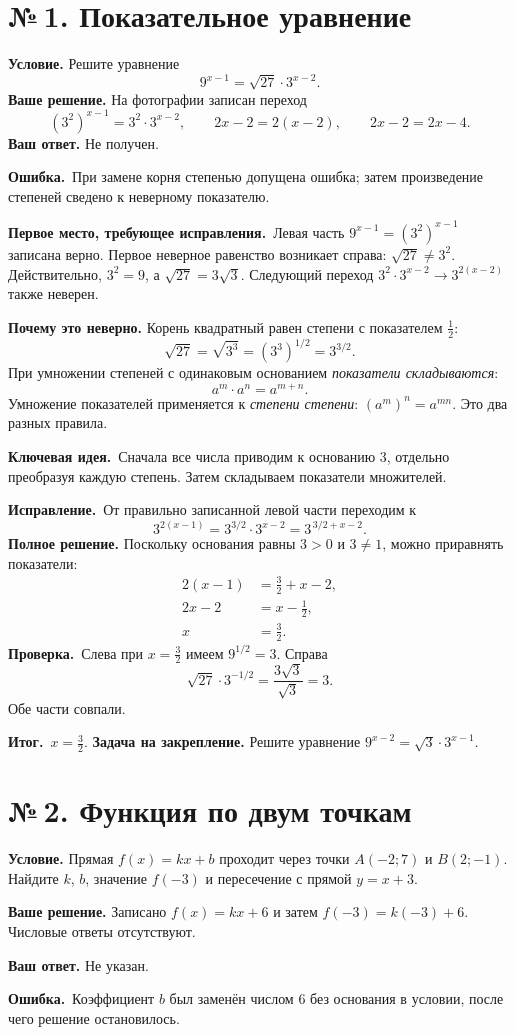 \documentclass[a4paper,12pt]{article}
\newcommand{\errlabel}{\textcolor{err}{\textbf{Ошибка.}}}
\newcommand{\keylabel}{\textcolor{accent}{\textbf{Ключевая идея.}}}
\newcommand{\resultlabel}{\textcolor{accent}{\textbf{Итог.}}}
\newcommand{\reviewtask}[2]{\clearpage\phantomsection\label{task:#1}\section*{\textcolor{accent}{№\,#1. #2}}}
\newcommand{\firstwrong}{\textbf{Первое место, требующее исправления.}}
\newcommand{\fix}{\textbf{Исправление.}}
\newcommand{\verify}{\textbf{Проверка.}}
\newcommand{\practice}{\medskip\textbf{Задача на закрепление.} }
\begin{document}
\reviewtask{1}{Показательное уравнение}
\textbf{Условие.} Решите уравнение
\[
9^{x-1}=\sqrt{27}\cdot3^{x-2}.
\]
\textbf{Ваше решение.} На фотографии записан переход
\[
(3^2)^{x-1}=3^2\cdot3^{x-2},\qquad
2x-2=2(x-2),\qquad 2x-2=2x-4.
\]
\textbf{Ваш ответ.} Не получен.

\errlabel\ При замене корня степенью допущена ошибка; затем произведение степеней сведено к неверному показателю.

\firstwrong\ Левая часть $9^{x-1}=(3^2)^{x-1}$ записана верно. Первое неверное равенство возникает справа: $\sqrt{27}\ne3^2$. Действительно, $3^2=9$, а $\sqrt{27}=3\sqrt3$. Следующий переход $3^2\cdot3^{x-2}\to3^{2(x-2)}$ также неверен.

\textbf{Почему это неверно.} Корень квадратный равен степени с показателем $\frac12$:
\[
\sqrt{27}=\sqrt{3^3}=(3^3)^{1/2}=3^{3/2}.
\]
При умножении степеней с одинаковым основанием \emph{показатели складываются}:
\[
a^m\cdot a^n=a^{m+n}.
\]
Умножение показателей применяется к \emph{степени степени}: $(a^m)^n=a^{mn}$. Это два разных правила.

\keylabel\ Сначала все числа приводим к основанию $3$, отдельно преобразуя каждую степень. Затем складываем показатели множителей.

\fix\ От правильно записанной левой части переходим к
\[
3^{2(x-1)}=3^{3/2}\cdot3^{x-2}
=3^{\,3/2+x-2}.
\]
\textbf{Полное решение.} Поскольку основания равны $3>0$ и $3\ne1$, можно приравнять показатели:
\begin{align*}
2(x-1)&=\frac32+x-2,\\
2x-2&=x-\frac12,\\
x&=\frac32.
\end{align*}
\verify\ Слева при $x=\frac32$ имеем $9^{1/2}=3$. Справа
\[
\sqrt{27}\cdot3^{-1/2}
=\frac{3\sqrt3}{\sqrt3}=3.
\]
Обе части совпали.

\resultlabel\ $\boxed{x=\frac32}$.
\practice Решите уравнение $9^{x-2}=\sqrt3\cdot3^{x-1}$.

\reviewtask{2}{Функция по двум точкам}
\textbf{Условие.} Прямая $f(x)=kx+b$ проходит через точки $A(-2;7)$ и $B(2;-1)$. Найдите $k$, $b$, значение $f(-3)$ и пересечение с прямой $y=x+3$.

\textbf{Ваше решение.} Записано $f(x)=kx+6$ и затем $f(-3)=k(-3)+6$. Числовые ответы отсутствуют.

\textbf{Ваш ответ.} Не указан.

\errlabel\ Коэффициент $b$ был заменён числом $6$ без основания в условии, после чего решение остановилось.
\end{document}
